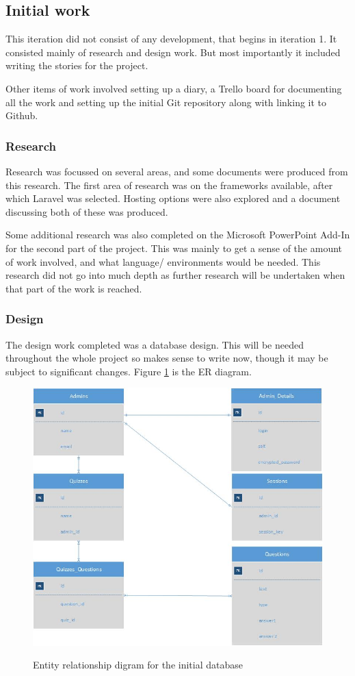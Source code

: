 \subsection{Initial work}
This iteration did not consist of any development, that begins in iteration 1. It consisted mainly of research and design work. But most importantly it included writing the stories for the project. 

Other items of work involved setting up a diary, a Trello board for documenting all the work and setting up the initial Git repository along with linking it to Github.
\subsubsection{Research}
Research was focussed on several areas, and some documents were produced from this research. The first area of research was on the frameworks available, after which Laravel was selected. Hosting options were also explored and a document discussing both of these was produced.

Some additional research was also completed on the Microsoft PowerPoint Add-In for the second part of the project. This was mainly to get a sense of the amount of work involved, and what language/ environments would be needed. This research did not go into much depth as further research will be undertaken when that part of the work is reached.
\subsubsection{Design}
The design work completed was a database design. This will be needed throughout the whole project so makes sense to write now, though it may be subject to significant changes. Figure \ref{fig:initial-er-diagram} is the ER diagram.

\begin{figure}
	\caption{Entity relationship digram for the initial database}
	\includegraphics[width=\textwidth]{Chapter2/Iter-0/Initial-ERDiagram}
	\label{fig:initial-er-diagram}
\end{figure}

